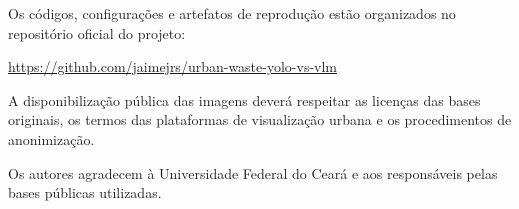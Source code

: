 \documentclass[kdmile,a4paper]{kdmile}
\begin{document}
Os códigos, configurações e artefatos de reprodução estão organizados no repositório oficial do projeto:
\begin{center}
\url{https://github.com/jaimejrs/urban-waste-yolo-vs-vlm}
\end{center}
A disponibilização pública das imagens deverá respeitar as licenças das bases originais, os termos das plataformas de visualização urbana e os procedimentos de anonimização.

\begin{acks}
Os autores agradecem à Universidade Federal do Ceará e aos responsáveis pelas bases públicas utilizadas.
\end{acks}




\begin{received}
\end{received}
\end{document}
